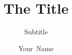\title[Footer Title]{The Title}
\subtitle{Subtitle}
\author{Your~Name}
\beamertemplatenavigationsymbolsempty